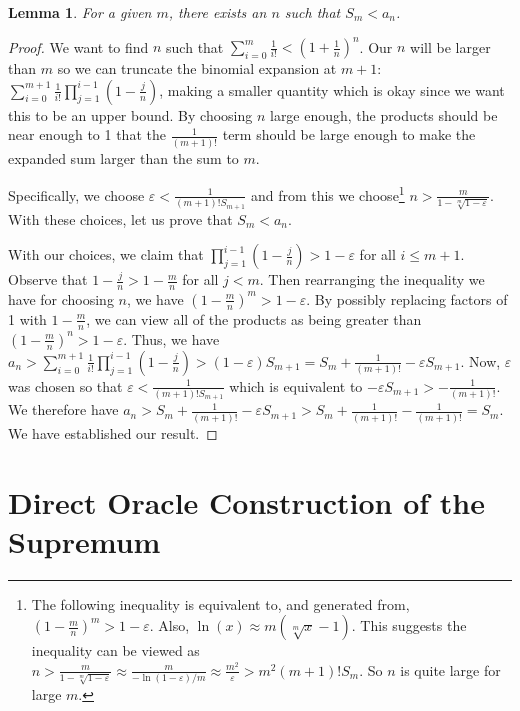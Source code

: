 \documentclass[12pt]{article}
\newtheorem{lemma}{Lemma}[subsection]
\begin{document}
\begin{lemma}\label{lem:snam}
For a given $m$, there exists an $n$ such that $S_m < a_n$.   
\end{lemma}

\begin{proof}
 We want to find $n$ such that $\sum_{i=0}^m \frac{1}{i!} < (1+\frac{1}{n})^n$. Our $n$ will be larger than $m$ so we can truncate the binomial expansion at $m+1$: $\sum_{i=0}^{m+1} \frac{1}{i!} \prod_{j=1}^{i-1} (1-\tfrac{j}{n})$, making a smaller quantity which is okay since we want this to be an upper bound. By choosing $n$ large enough, the products should be near enough to 1 that the $\frac{1}{(m+1)!}$ term should be large enough to make the expanded sum larger than the sum to $m$. 

 Specifically, we choose $\varepsilon < \frac{1}{(m+1)! S_{m+1}  }$ and from this we choose\footnote{The  following inequality is equivalent to, and generated from, $(1-\tfrac{m}{n})^m > 1 - \varepsilon$. Also, $\ln(x) \approx m (\sqrt[m]{x} -1)$. This suggests the inequality can be viewed as $n > \frac{m}{1 - \sqrt[m]{1-\varepsilon}} \approx \frac{m}{-\ln(1 - \varepsilon)/m} \approx \frac{m^2}{\varepsilon} > m^2 (m+1)! S_m$. So $n$ is quite large for large $m$.}  $n > \frac{m}{ 1 - \sqrt[m]{1-\varepsilon}}$. With these choices, let us prove that $S_m < a_n$. 
 
 With our choices, we claim that $\prod_{j=1}^{i-1} (1-\tfrac{j}{n}) > 1-\varepsilon$ for all $i \leq m+1$. Observe that $1-\tfrac{j}{n} > 1 -\tfrac{m}{n}$ for all $j < m$. Then rearranging the inequality we have for choosing $n$, we have $(1 - \tfrac{m}{n})^m > 1 - \varepsilon $. By possibly replacing factors of 1 with $1-\tfrac{m}{n}$, we can view all of the products as being greater than $(1 - \tfrac{m}{n})^n > 1-\varepsilon$.  Thus, we have 
 $a_n >  \sum_{i=0}^{m+1} \frac{1}{i!} \prod_{j=1}^{i-1} (1-\tfrac{j}{n}) > (1-\varepsilon) S_{m+1} = S_m + \frac{1}{(m+1)!} - \varepsilon S_{m+1}$.  Now, $\varepsilon$ was chosen so that $\varepsilon < \frac{1}{(m+1)! S_{m+1}}$ which is equivalent to $- \varepsilon S_{m+1} > -\frac{1}{(m+1)!}$. We therefore have $a_n > S_m + \frac{1}{(m+1)!} - \varepsilon S_{m+1} > S_m + \frac{1}{(m+1)!} - \frac{1}{(m+1)!} = S_m$. We have established our result. 
\end{proof}




\section{Direct Oracle Construction of the Supremum}\label{app:sup}
\end{document}

